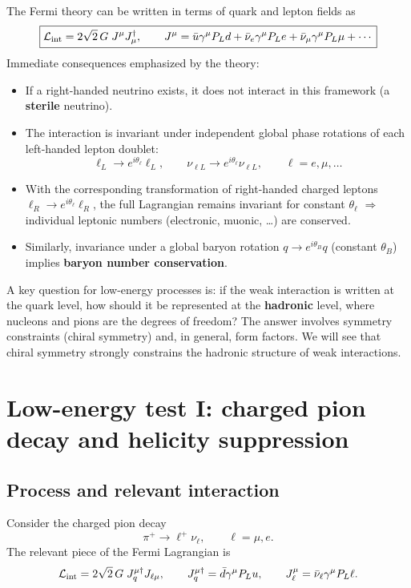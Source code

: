 The Fermi theory can be written in terms of quark and lepton fields as
\begin{equation}
\boxed{
\mathcal{L}_{\rm int}
=
2\sqrt{2}\,G\;J^\mu J_\mu^\dagger,
\qquad
J^\mu=\bar u\gamma^\mu P_L d
+\bar\nu_e\gamma^\mu P_L e
+\bar\nu_\mu\gamma^\mu P_L \mu+\cdots
}
\end{equation}
Immediate consequences emphasized by the theory:
\begin{itemize}
  \item If a right-handed neutrino exists, it does not interact in this framework
        (a \textbf{sterile} neutrino).
  \item The interaction is invariant under independent global phase rotations
        of each left-handed lepton doublet:
        \begin{equation}
          \ell_L\to e^{i\theta_\ell}\ell_L,\qquad
          \nu_{\ell L}\to e^{i\theta_\ell}\nu_{\ell L},
          \qquad \ell=e,\mu,\dots
        \end{equation}
  \item With the corresponding transformation of right-handed charged leptons
        $\ell_R\to e^{i\theta_\ell}\ell_R$, the full Lagrangian remains invariant for
        constant $\theta_\ell$ $\Rightarrow$ individual leptonic numbers (electronic, muonic, \dots)
        are conserved.
  \item Similarly, invariance under a global baryon rotation $q\to e^{i\theta_B}q$ (constant $\theta_B$)
        implies \textbf{baryon number conservation}.
\end{itemize}

A key question for low-energy processes is: if the weak interaction is written at the quark level,
how should it be represented at the \textbf{hadronic} level, where nucleons and pions are the degrees
of freedom? The answer involves symmetry constraints (chiral symmetry) and, in general, form factors.
We will see that chiral symmetry strongly constrains the hadronic structure of weak interactions.

\section{Low-energy test I: charged pion decay and helicity suppression}
\subsection{Process and relevant interaction}
Consider the charged pion decay
\begin{equation}
\pi^+ \to \ell^+ \nu_\ell,
\qquad \ell=\mu,e.
\end{equation}
The relevant piece of the Fermi Lagrangian is
\begin{equation}
\mathcal{L}_{\rm int}
=
2\sqrt{2}\,G\;J^{\mu\dagger}_q J_{\ell\mu},
\qquad
J^{\mu\dagger}_q=\bar d\gamma^\mu P_L u,
\qquad
J^\mu_\ell=\bar\nu_\ell\gamma^\mu P_L \ell.
\end{equation}

